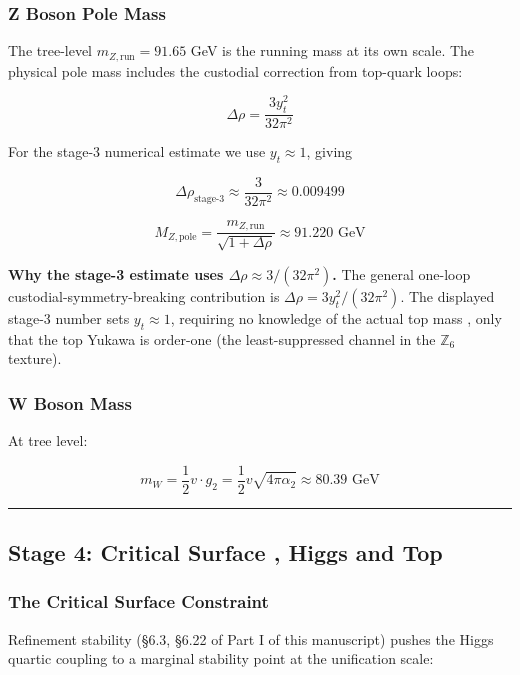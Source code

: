 \subsubsection{Z Boson Pole Mass}\label{41-z-boson-pole-mass}

The tree-level \(m_{Z,\text{run}} = 91.65\) GeV is the running mass at its own scale. The physical pole mass includes the custodial correction from top-quark loops:

\[\Delta\rho = \frac{3y_t^2}{32\pi^2}\]

For the stage-3 numerical estimate we use \(y_t \approx 1\), giving

\[\Delta\rho_{\text{stage-3}} \approx \frac{3}{32\pi^2} \approx 0.009499\]

\[M_{Z,\text{pole}} = \frac{m_{Z,\text{run}}}{\sqrt{1 + \Delta\rho}} \approx 91.220 \text{ GeV}\]

\textbf{Why the stage-3 estimate uses \(\Delta\rho \approx 3/(32\pi^2)\).} The general one-loop custodial-symmetry-breaking contribution is \(\Delta\rho = 3y_t^2/(32\pi^2)\). The displayed stage-3 number sets \(y_t \approx 1\), requiring no knowledge of the actual top mass , only that the top Yukawa is order-one (the least-suppressed channel in the \(\mathbb{Z}_6\) texture).

\subsubsection{W Boson Mass}\label{42-w-boson-mass}

At tree level:

\[m_W = \frac{1}{2} v \cdot g_2 = \frac{1}{2} v \sqrt{4\pi\alpha_2} \approx 80.39 \text{ GeV}\]

\begin{center}\rule{0.5\linewidth}{0.5pt}\end{center}

\subsection{Stage 4: Critical Surface , Higgs and Top}\label{5-stage-4-critical-surface--higgs-and-top}

\subsubsection{The Critical Surface Constraint}\label{51-the-critical-surface-constraint}

Refinement stability (\S{}6.3, \S{}6.22 of Part I of this manuscript) pushes the Higgs quartic coupling to a marginal stability point at the unification scale:

